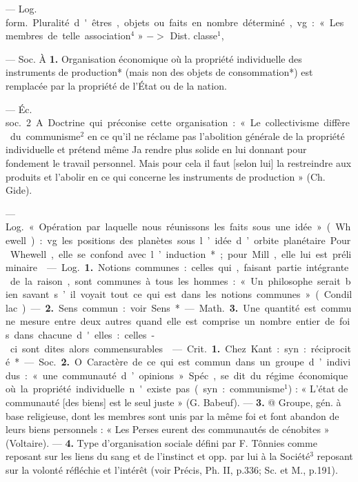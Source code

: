 \begin{itemize}[leftmargin=1cm, label=, itemsep=11pt]
 — \si{Log. form.} Pluralité
d'êtres, objets ou faits en nombre
déterminé, vg. : « Les membres de
telle association$^4$ » $->$ Dist. classe$^1$,

 — Soc. À {\bf 1.} Organisation économique où la propriété
individuelle des instruments de production* (mais non des objets de
consommation*) est remplacée par
la propriété de l’État ou de la nation.

— \si{Éc. soc.} 2 A. Doctrine qui préconise cette organisation : « Le collectivisme diffère du communisme$^2$
en ce qu'il ne réclame pas l'abolition
générale de la propriété individuelle
et prétend même Ja rendre plus
solide en lui donnant pour fondement le travail personnel. Mais pour
cela il faut [selon lui] la restreindre
aux produits et l’abolir en ce qui
concerne les instruments de production » (Ch. Gide).

 — \si{Log.} « Opération par
laquelle nous réunissons les faits
sous une idée » (Whewell) : vg. les
positions des planètes sous l’idée
d’orbite planétaire. Pour Whewell,
elle se confond avec l’induction*;
pour Mill, elle lui est préliminaire.

 — \si{Log.} {\bf 1.} Notions communes : celles qui, faisant partie intégrante de la raison, sont communes
à tous les hommes : « Un philosophe serait bien savant s’il voyait
tout ce qui est dans les notions
communes » (Condillac). —  {\bf 2.} Sens
commun : voir Sens*.

— \si{Math.}  {\bf 3.} Une quantité est
commune mesure entre deux autres
quand elle est comprise un nombre
entier de fois dans chacune d'elles :
celles-ci sont dites alors commensurables.

 — \si{Crit.} {\bf 1.} Chez Kant :
syn. : réciprocité*.

— \si{Soc.} {\bf 2.} O Caractère de ce qui
est commun dans un groupe d’individus : « une communauté d’opinions ». Spéc., se dit du régime économique où la propriété individuelle n'existe pas (syn. : communisme$^1$) : « L'état de communauté
[des biens] est le seul juste » (G. Babeuf). — {\bf 3.} @ Groupe, gén. à base
religieuse, dont les membres sont
unis par la même foi et font abandon
de leurs biens personnels : « Les
Perses eurent des communautés de
cénobites » (Voltaire). — {\bf 4.} Type
d'organisation sociale défini par
F. Tônnies comme reposant sur les
liens du sang et de l'instinct et opp.
par lui à la Société$^3$ reposant sur la
volonté réfléchie et l'intérêt (voir
Précis, Ph. II, p.336; Sc. et M., p.191).


\end{itemize}
